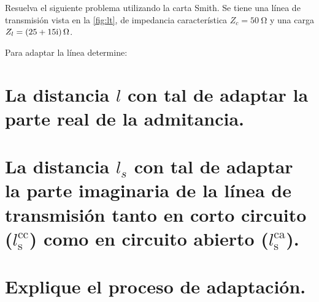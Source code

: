 \documentclass[
  11pt,
  letterpaper,
  answers
]{exam}
\begin{document}
\vspace{0.5cm}
\noindent
\begin{questions}



\question Resuelva el siguiente problema utilizando la carta Smith. Se tiene una línea de transmisión vista en la \cref{fig:lt}, de impedancia característica $Z_c = \qty{50}{\ohm}$ y una carga $Z_l = \complexqty{25+15j}{\ohm}$.
    
    \begin{center}
      \label{fig:lt}
    \end{center}

    Para adaptar la línea determine:
    \begin{parts}
      \part[2]{La distancia $l$ con tal de adaptar la parte real de la admitancia.}
  
      \part[4]{La distancia $l_s$ con tal de adaptar la parte imaginaria de la línea de transmisión tanto en corto circuito ($l_\text{s}^\text{cc}$) como en circuito abierto ($l_\text{s}^\text{ca}$).}
  
      \part[3]{Explique el proceso de adaptación.}

\end{parts}
\end{questions}
\end{document}
